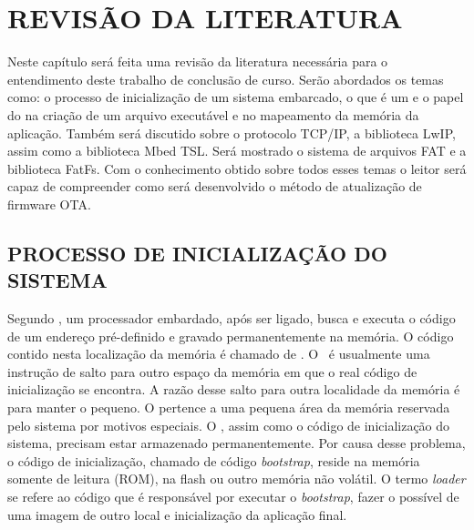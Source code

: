 
\chapter{REVISÃO DA LITERATURA}
\label{chap:fundamentacaoTeorica}
Neste capítulo será feita uma revisão da literatura necessária para o entendimento deste trabalho de conclusão de curso. 
Serão abordados os temas como: o processo de inicialização de um sistema embarcado, o que é um \bootloader  e o papel do \linker na criação de um arquivo executável e no mapeamento da memória da aplicação.
Também será discutido sobre o protocolo TCP/IP, a biblioteca LwIP, assim como a biblioteca Mbed TSL.
Será mostrado o sistema de arquivos FAT e a biblioteca FatFs.
Com o conhecimento obtido sobre todos esses temas o leitor será capaz de compreender como será desenvolvido o método de atualização de firmware OTA.


\section{PROCESSO DE INICIALIZAÇÃO DO SISTEMA}

Segundo , um processador embardado, após ser ligado, busca e executa o código de um endereço pré-definido e gravado permanentemente na memória. O código contido nesta localização da memória é chamado de \resetv. O \resetv\ é usualmente uma instrução de salto para outro espaço da memória em que o real código de inicialização se encontra. A razão desse salto para outra localidade da memória é para manter o \resetv pequeno. O \resetv pertence a uma pequena área da memória reservada pelo sistema por motivos especiais. O \resetv, assim como o código de inicialização do sistema, precisam estar armazenado permanentemente. Por causa desse problema, o código de inicialização, chamado de código \textit{bootstrap}, reside na memória somente de leitura (ROM), na flash ou outro memória não volátil. O termo \textit{loader} se refere ao código que é responsável por executar o \textit{bootstrap}, fazer o possível \download de uma imagem de outro local e inicialização da aplicação final.

